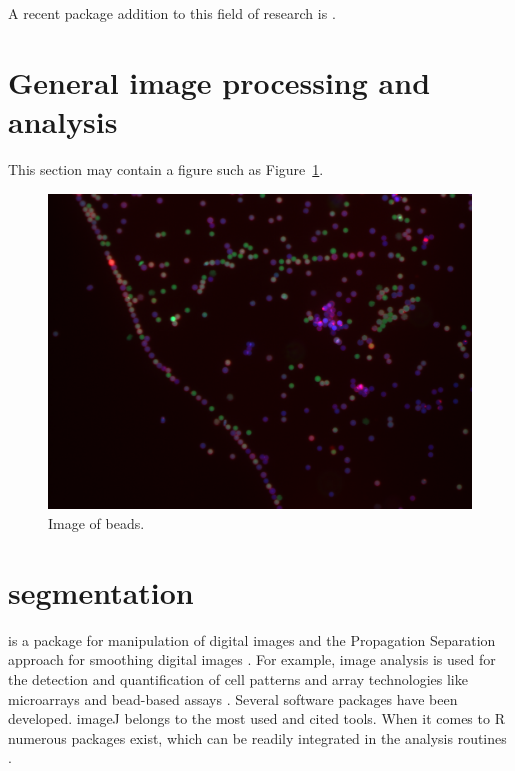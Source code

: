 A recent package addition to this field of research is  \citep{barthelme_imager:_2016}.



\section{General image processing and analysis}

This section may contain a figure such as Figure~\ref{figure:bead}.

\begin{figure}[htbp]
  \centering
  \includegraphics[clip=true,trim=0.1cm 0.3cm 0.2cm 0.1cm, width=12cm]{bead}
  \caption{Image of beads.}
  \label{figure:bead}
\end{figure}

\section{segmentation}

\citep{holmes_interactive_2009}

 is a package for manipulation of digital images and the 
Propagation Separation approach for smoothing digital images \citep{polzehl_adaptive_2007}.
For example, image analysis is used for the detection and quantification of 
cell patterns and array technologies like microarrays and bead-based assays 
\citep{rodiger_highly_2013, willitzki_new_2012, willitzki_fully_2013, 
dunning_beadarray:_2006}.
Several software packages have been developed. imageJ belongs to the most 
used and cited tools. When it comes to R numerous packages exist, which can 
be readily integrated in the analysis routines \citep{frery_introduction_2013}.


